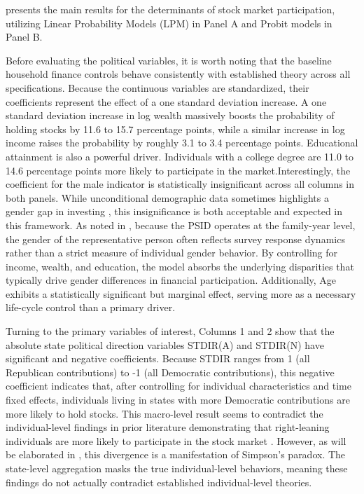  presents the main results for the determinants of stock market participation, utilizing Linear Probability Models (LPM) in Panel A and Probit models in Panel B.

Before evaluating the political variables, it is worth noting that the baseline household finance controls behave consistently with established theory across all specifications. Because the continuous variables are standardized, their coefficients represent the effect of a one standard deviation increase. A one standard deviation increase in log wealth massively boosts the probability of holding stocks by 11.6 to 15.7 percentage points, while a similar increase in log income raises the probability by roughly 3.1 to 3.4 percentage points. Educational attainment is also a powerful driver. Individuals with a college degree are 11.0 to 14.6 percentage points more likely to participate in the market.Interestingly, the coefficient for the male indicator is statistically insignificant across all columns in both panels. While unconditional demographic data sometimes highlights a gender gap in investing \citep{almenberg2015}, this insignificance is both acceptable and expected in this framework. As noted in , because the PSID operates at the family-year level, the gender of the representative person often reflects survey response dynamics rather than a strict measure of individual gender behavior. By controlling for income, wealth, and education, the model absorbs the underlying disparities that typically drive gender differences in financial participation. Additionally, Age exhibits a statistically significant but marginal effect, serving more as a necessary life-cycle control than a primary driver.

Turning to the primary variables of interest, Columns 1 and 2 show that the absolute state political direction variables STDIR(A) and STDIR(N) have significant and negative coefficients. Because STDIR ranges from 1 (all Republican contributions) to -1 (all Democratic contributions), this negative coefficient indicates that, after controlling for individual characteristics and time fixed effects, individuals living in states with more Democratic contributions are more likely to hold stocks. This macro-level result seems to contradict the individual-level findings in prior literature demonstrating that right-leaning individuals are more likely to participate in the stock market \citep{kaustia2011, ke2024}. However, as will be elaborated in , this divergence is a manifestation of Simpson's paradox. The state-level aggregation masks the true individual-level behaviors, meaning these findings do not actually contradict established individual-level theories.

